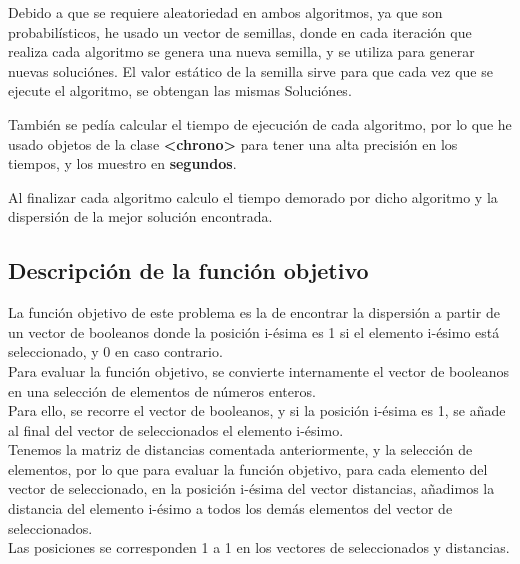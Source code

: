 \documentclass{article}
\begin{document}
Debido a que se requiere aleatoriedad en ambos algoritmos, ya que son probabilísticos, he usado un vector de semillas, 
donde en cada iteración que 
realiza cada algoritmo se genera una nueva semilla, y se utiliza para generar nuevas soluciónes.
El valor estático de la semilla sirve para que cada vez que se ejecute el algoritmo, se obtengan las mismas Soluciónes.

También se pedía calcular el tiempo de ejecución de cada algoritmo, por lo que he usado objetos de la clase 
\textbf{<chrono>} para tener una alta precisión en los tiempos, y los muestro en \textbf{segundos}.

\vspace{5mm}

Al finalizar cada algoritmo calculo el tiempo demorado por dicho algoritmo y la dispersión de la 
mejor solución encontrada.

\subsection{\large Descripción de la función objetivo}
La función objetivo de este problema es la de encontrar la dispersión a partir de un vector de 
booleanos donde la posición i-ésima es 1 si el elemento i-ésimo está seleccionado, y 0 en caso contrario.\\
Para evaluar la función objetivo, se convierte internamente el vector de booleanos en una selección 
de elementos de números enteros.\\
Para ello, se recorre el vector de booleanos, y si la posición i-ésima es 1, se añade al final del vector de 
seleccionados el elemento i-ésimo.\\
Tenemos la matriz de distancias comentada anteriormente, y la selección de elementos, por lo
que para evaluar la función objetivo, para cada elemento del vector de seleccionado, en la posición i-ésima
del vector distancias, añadimos la distancia del elemento i-ésimo a todos los demás elementos del vector de seleccionados.\\
Las posiciones se corresponden 1 a 1 en los vectores de seleccionados y distancias.
\vspace{5mm}
\end{document}
